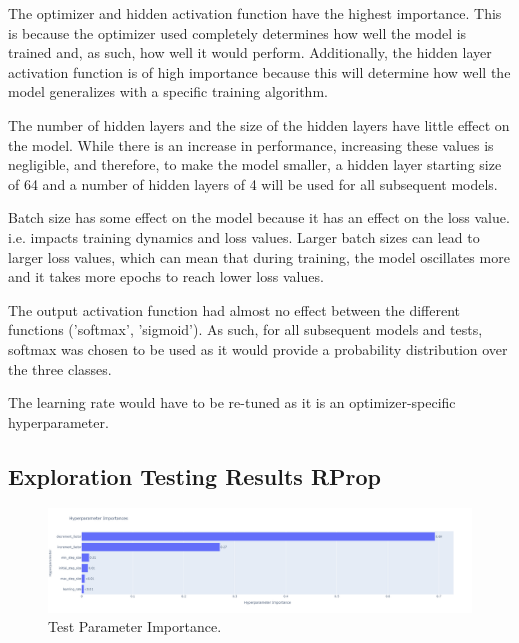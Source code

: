 \documentclass[conference]{IEEEtran}
\begin{document}
\FloatBarrier

The optimizer and hidden activation function have the highest importance. This is because the optimizer used completely determines how well the model is trained and, as such, how well it would perform. Additionally, the hidden layer activation function is of high importance because this will determine how well the model generalizes with a specific training algorithm.

The number of hidden layers and the size of the hidden layers have little effect on the model. While there is an increase in performance, increasing these values is negligible, and therefore, to make the model smaller, a hidden layer starting size of 64 and a number of hidden layers of 4 will be used for all subsequent models. 

Batch size has some effect on the model because it has an effect on the loss value. i.e. impacts training dynamics and loss values. Larger batch sizes can lead to larger loss values, which can mean that during training, the model oscillates more and it takes more epochs to reach lower loss values.

The output activation function had almost no effect between the different functions ('softmax', 'sigmoid'). As such, for all subsequent models and tests, softmax was chosen to be used as it would provide a probability distribution over the three classes.

The learning rate would have to be re-tuned as it is an optimizer-specific hyperparameter.

\subsection{Exploration Testing Results RProp}

\begin{figure}[htbp]
\centerline{\includegraphics[width=\columnwidth]{Ex RProp Hyp Opt Res Imp.png}}
\caption{Test Parameter Importance.}
\label{fig:Ex RProp Hyp Opt Res Imp}
\end{figure}

\FloatBarrier
\end{document}
